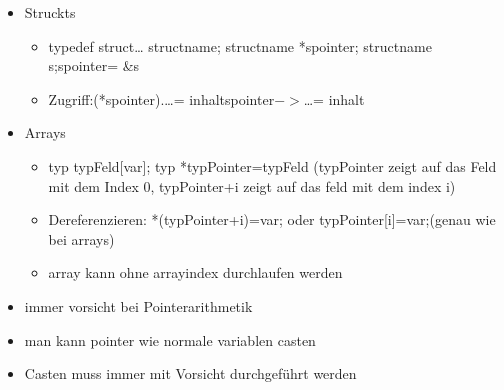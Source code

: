 \documentclass[10pt,a5paper]{article}
\begin{document}
\begin{itemize}
\begin{itemize}
\end{itemize}
\item Struckts\begin{itemize}
\item typedef struct{\dots} struct\textunderscore name; struct\textunderscore name *spointer; struct\textunderscore name s;spointer= \&s
\item Zugriff:\subitem (*spointer).\dots = inhalt\subitem spointer\ensuremath{->}\dots = inhalt
\end{itemize}
\item Arrays\begin{itemize}
\item typ typFeld[var]; typ *typPointer=typFeld (typPointer zeigt auf das Feld mit dem Index 0, typPointer+i zeigt auf das feld mit dem index i)
\item Dereferenzieren: *(typPointer+i)=var; oder typPointer[i]=var;(genau wie bei arrays)
\item array kann ohne arrayindex durchlaufen werden
\end{itemize}
\item immer vorsicht bei Pointerarithmetik
\item man kann pointer wie normale variablen casten
\item Casten muss immer mit Vorsicht durchgeführt werden
\end{itemize}
\end{document}
